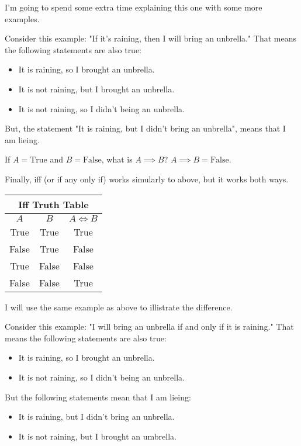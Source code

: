 I'm going to spend some extra time explaining this one with some more examples.

\begin{boxexample}{}{}
	Consider this example: "If it's raining, then I will bring an unbrella." That means the following statements are also true:
	\begin{itemize}
		\item It is raining, so I brought an unbrella.
		\item It is not raining, but I brought an unbrella.
		\item It is not raining, so I didn't being an unbrella.
	\end{itemize}
	But, the statement "It is raining, but I didn't bring an unbrella", means that I am lieing.
\end{boxexample}

\begin{boxexample}{}{}
	If $A=\text{True}$ and $B=\text{False}$, what is $A \implies B$? $A \implies B = \text{False}$.
\end{boxexample}

Finally, iff (or if any only if) works simularly to above, but it works both ways.

\begin{tabular}{c|c|c}
	\hline
	\multicolumn{3}{c}{Iff Truth Table}\\
	\hline
	$A$ & $B$ & $A \iff B$\\
	\hline
	True & True & True\\
	False & True & False\\
	True & False & False\\
	False & False & True\\
	\hline
\end{tabular}

I will use the same example as above to illistrate the difference.

\begin{boxexample}{}{}
	Consider this example: "I will bring an unbrella if and only if it is raining." That means the following statements are also true:
	\begin{itemize}
		\item It is raining, so I brought an unbrella.
		\item It is not raining, so I didn't being an unbrella.
	\end{itemize}
	But the following statements mean that I am lieing:
	\begin{itemize}
		\item It is raining, but I didn't bring an unbrella.
		\item It is not raining, but I brought an umbrella.
	\end{itemize}
\end{boxexample}

